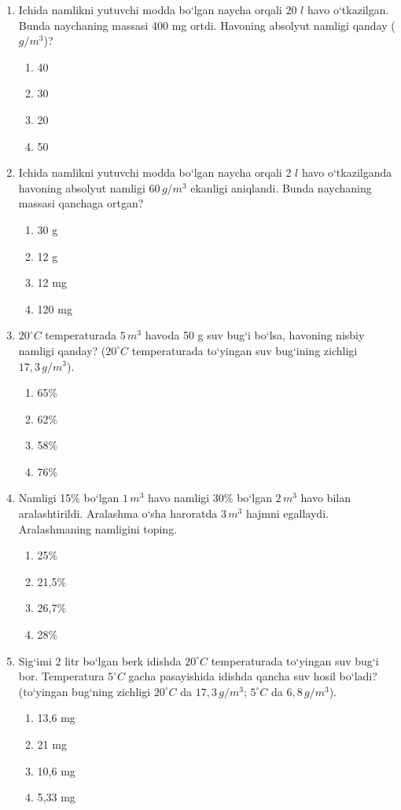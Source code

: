 \begin{enumerate}
\item Ichida namlikni yutuvchi modda bo‘lgan naycha orqali 20 $l$ havo o‘tkazilgan. Bunda naychaning massasi 400 mg ortdi. Havoning absolyut namligi qanday ($g/m^3$)?
\begin{enumerate}[label=\Alph*)]
\item 40
\item 30
\item 20
\item 50
\end{enumerate}

\item Ichida namlikni yutuvchi modda bo‘lgan naycha orqali 2 $l$ havo o‘tkazilganda havoning absolyut namligi $60 \, g/m^3$ ekanligi aniqlandi. Bunda naychaning massasi qanchaga ortgan?
\begin{enumerate}[label=\Alph*)]
\item 30 g
\item 12 g
\item 12 mg
\item 120 mg
\end{enumerate}

\item $20^\circ C$ temperaturada $5 \, m^3$ havoda 50 g suv bug‘i bo‘lsa, havoning nisbiy namligi qanday? ($20^\circ C$ temperaturada to‘yingan suv bug‘ining zichligi $17,3 \, g/m^3$).
\begin{enumerate}[label=\Alph*)]
\item 65\%
\item 62\%
\item 58\%
\item 76\%
\end{enumerate}

\item Namligi 15\% bo‘lgan $1 \, m^3$ havo namligi 30\% bo‘lgan $2 \, m^3$ havo bilan aralashtirildi. Aralashma o‘sha haroratda $3 \, m^3$ hajmni egallaydi. Aralashmaning namligini toping.
\begin{enumerate}[label=\Alph*)]
\item 25\%
\item 21,5\%
\item 26,7\%
\item 28\%
\end{enumerate}

\item Sig‘imi 2 litr bo‘lgan berk idishda $20^\circ C$ temperaturada to‘yingan suv bug‘i bor. Temperatura $5^\circ C$ gacha pasayishida idishda qancha suv hosil bo‘ladi? (to‘yingan bug‘ning zichligi $20^\circ C$ da $17,3 \, g/m^3$; $5^\circ C$ da $6,8 \, g/m^3$).
\begin{enumerate}[label=\Alph*)]
\item 13,6 mg
\item 21 mg
\item 10,6 mg
\item 5,33 mg
\end{enumerate}


\end{enumerate}
